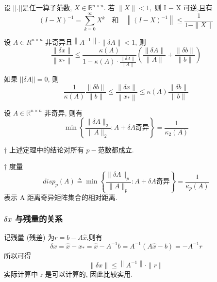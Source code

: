 \documentclass[12pt,a4paper]{article}
\begin{document}
\begin{lemma}
	设 $||.||$是任一算子范数, $X ∈\mathbb{R}^{n×n}$. 若 $∥X∥ < 1,$ 则 I − X 可逆,且有
	\begin{equation}
	(I-X)^{-1}=\sum_{k=0}^{\infty} X^{k} \quad \text{和} \quad\left\|(I-X)^{-1}\right\| \leq \frac{1}{1-\|X\|}
	\end{equation}
\end{lemma}



\begin{theorem}
	设 $A ∈ R^{n×n}$ 非奇异且$\left\|A^{-1}\right\| \cdot\|\delta A\|<1$, 则
	\begin{equation}
	\frac{\|\delta x\|}{\left\|x_{*}\right\|} \leq \frac{\kappa(A)}{1-\kappa(A) \cdot \frac{\|\delta A\|}{\|A\|}}\left(\frac{\|\delta A\|}{\|A\|}+\frac{\|\delta b\|}{\|b\|}\right)
	\end{equation}
	
	如果 $||\delta A||=0$, 则
	\begin{equation}
	\frac{1}{\kappa(A)} \frac{\|\delta b\|}{\|b\|} \leq \frac{\|\delta x\|}{\left\|x_{*}\right\|} \leq \kappa(A) \frac{\|\delta b\|}{\|b\|}
	\end{equation}
\end{theorem}



\begin{theorem}
	设 $A ∈ \mathbb{R}^{n×n}$ 非奇异, 则有
	\begin{equation}
	\min \left\{\frac{\|\delta A\|_{2}}{\|A\|_{2}} : A+\delta A \text{奇异}\right\}=\frac{1}{\kappa_{2}(A)}
	\end{equation}
\end{theorem}



† 上述定理中的结论对所有 $p-$范数都成立.



† 度量
\begin{equation}
disp_p(A) \triangleq \min \left\{\frac{\|\delta A\|_{p}}{\|A\|_{p}} : A+\delta A \text{奇异}\right\}=\frac{1}{\kappa_{p}(A)}
\end{equation}	
表示 A 距离奇异矩阵集合的相对距离.


\subsubsection{$δx$ 与残量的关系}
记残量 (残差) 为$r=b-A \hat{x}$,则有
\begin{equation}
\delta x=\hat{x}-x_{*}=\hat{x}-A^{-1} b=A^{-1}(A \hat{x}-b)=-A^{-1} r
\end{equation}
所以可得
\begin{equation}
\|\delta x\| \leq\left\|A^{-1}\right\| \cdot\|r\|
\end{equation}
实际计算中 r 是可以计算的, 因此比较实用.
\end{document}
